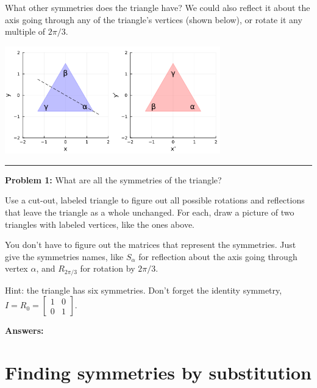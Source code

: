 \documentclass[letter]{article}
\newcommand{\Sa}{S_{\alpha}}
\begin{document}
\vspace{2mm}
What other symmetries does the triangle have? We could also reflect it about the axis going
through any of the triangle's vertices (shown below), or rotate it any multiple of $2\pi/3$. 
\begin{center}
\includegraphics[width=0.7\textwidth]{triangle-Salpha.png}
\end{center}

\vspace{8mm}
\rule{\textwidth}{0.5pt}
{\bf Problem 1:} What are all the symmetries of the triangle?

\vspace{2mm} Use a cut-out, labeled triangle to figure out all possible rotations and reflections
that leave the triangle as a whole unchanged. For each, draw a picture of two triangles with
labeled vertices, like the ones above.

\vspace{2mm} You don't have to figure out the matrices that represent the symmetries. Just give
the symmetries names, like $\Sa$ for reflection about the axis going through vertex $\alpha$, and
$R_{2\pi/3}$ for rotation by $2\pi/3$. 

\vspace{2mm} Hint: the triangle has six symmetries. Don't forget the identity symmetry,
$I = R_0 = \begin{bmatrix} 1 & 0 \\ 0 & 1 \end{bmatrix}$.

\pagebreak
\vspace{2mm} {\bf Answers:}

\pagebreak

\section{Finding symmetries by substitution}
\end{document}
